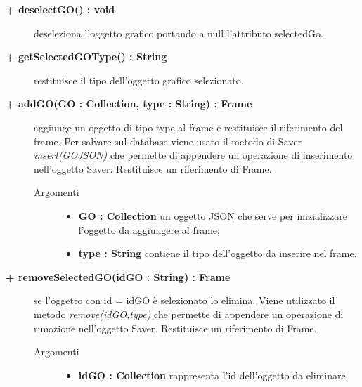 \begin{description}
\begin{description}
\begin{description}
		\item[\textbf{\color{blue}+ deselectGO() : void			}] \hfill
			deseleziona l'oggetto grafico portando a null l'attributo selectedGo. 
\end{description}

\begin{description}
		\item[\textbf{\color{blue}+ getSelectedGOType() : String			}] \hfill
			restituisce il tipo dell'oggetto grafico selezionato.
\end{description}

\begin{description}
		\item[\textbf{\color{blue}+ addGO(GO : Collection, type : String) : Frame			}] \hfill
			aggiunge un oggetto di tipo type al frame e restituisce il riferimento del frame. Per  salvare sul database viene usato il metodo di Saver \textit{insert(GOJSON)} che permette di appendere un operazione di inserimento nell'oggetto Saver. Restituisce un riferimento di Frame.  

\begin{description}
			\item[Argomenti] \hfill
				\begin{itemize}
						\item \textbf{GO : Collection			} \hfill
					un oggetto JSON che serve per inizializzare l'oggetto da aggiungere al frame;
					  	\item \textbf{type : String			} \hfill
					  	contiene il tipo dell'oggetto da inserire nel frame.
				\end{itemize}

\end{description}

\end{description}


\begin{description}
		\item[\textbf{\color{blue}+ removeSelectedGO(idGO : String) : Frame			}] \hfill
			se l'oggetto con id = idGO è selezionato lo elimina. Viene utilizzato il metodo \textit{remove(idGO,type)} che permette di appendere un operazione di rimozione nell'oggetto Saver. Restituisce un riferimento di Frame.

\begin{description}
			\item[Argomenti] \hfill
				\begin{itemize}
						\item \textbf{idGO : Collection			} \hfill
						rappresenta l'id dell'oggetto da eliminare.
				\end{itemize}


\end{description}
\end{description}
\end{description}
\end{description}
